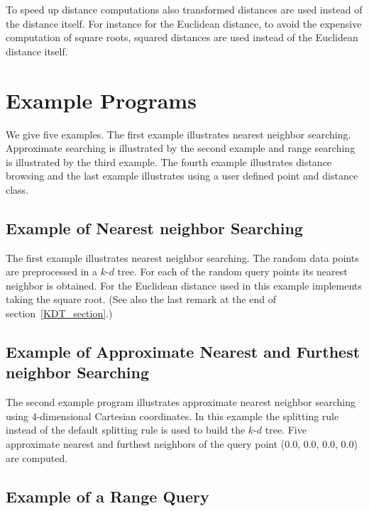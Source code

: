 To speed up distance computations also transformed
distances are used instead of the distance itself. 
For instance for the Euclidean distance, to avoid the expensive computation
of square roots, squared distances are used instead of the Euclidean distance itself. 

\section{Example Programs}

We give five examples. 
The first example illustrates nearest neighbor searching.
Approximate searching is illustrated by the second example and range
searching is illustrated by the third example.
The fourth example illustrates distance browsing and the last example illustrates using
a user defined point and distance class.

\subsection{Example of Nearest neighbor Searching}

The first example illustrates nearest neighbor searching. The random data points are preprocessed
in a $k$-$d$ tree. For each of the random query points its nearest neighbor is obtained.
For the Euclidean distance used in this example 
implements taking the square root. (See also the last remark at the end of section~\ref{KDT_section}.)



\subsection{Example of Approximate Nearest and Furthest neighbor Searching}

The second example program illustrates approximate nearest neighbor searching
using 4-dimensional Cartesian coordinates.
In this example the  splitting rule instead of the default splitting
rule is used to build the $k$-$d$ tree. Five approximate nearest and furthest neighbors of
the query point (0.0, 0.0, 0.0, 0.0) are computed.
 

\subsection{Example of a Range Query}


